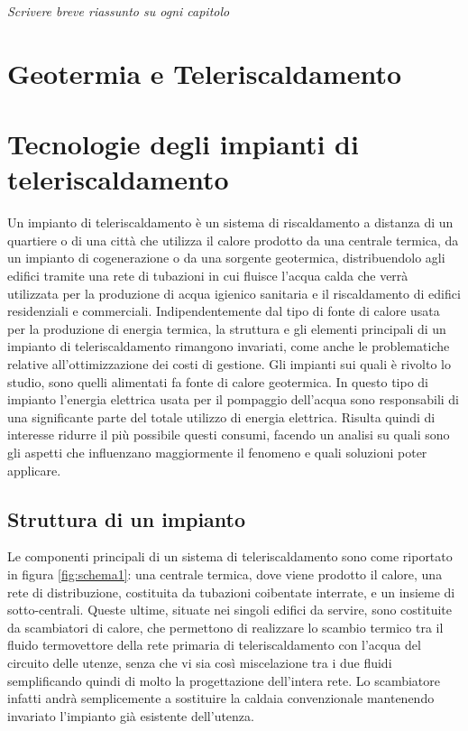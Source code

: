 \documentclass[laurea,oneside,11pt]{USiena_tesiLM}
\begin{document}
\textit{Scrivere breve riassunto su ogni capitolo}

\chapter{Geotermia e Teleriscaldamento}

\chapter{Tecnologie degli impianti di teleriscaldamento}
Un impianto di teleriscaldamento è un  sistema di riscaldamento a distanza di un quartiere o di una città 
che utilizza il calore prodotto da una centrale termica, da un impianto di cogenerazione o da una sorgente geotermica, distribuendolo agli edifici tramite una rete di tubazioni in cui fluisce l'acqua calda che verrà utilizzata per la produzione di acqua igienico sanitaria e il riscaldamento di edifici residenziali e commerciali. Indipendentemente dal tipo di fonte di calore usata per la produzione di energia termica, la struttura e gli elementi principali di un impianto di teleriscaldamento rimangono invariati, come anche le problematiche relative all'ottimizzazione dei costi di gestione. Gli impianti sui quali è rivolto lo studio, sono quelli alimentati fa fonte di calore geotermica. In questo tipo di impianto l'energia elettrica usata per il pompaggio dell'acqua sono responsabili di una significante parte del totale utilizzo di energia elettrica. Risulta quindi di interesse ridurre il più possibile questi consumi, facendo un analisi su quali sono gli aspetti che influenzano maggiormente il fenomeno e quali soluzioni poter applicare. \\

\section{Struttura di un impianto}
Le componenti principali di un sistema di teleriscaldamento sono come riportato in figura \ref{fig:schema1}: una centrale termica, dove viene prodotto il calore, una rete di distribuzione, costituita da tubazioni 
coibentate interrate, e un insieme di sotto-centrali. Queste ultime, situate nei singoli 
edifici da servire, sono costituite da scambiatori di calore, che permettono di realizzare 
lo scambio termico tra il fluido termovettore  della rete primaria di teleriscaldamento con l'acqua del circuito delle utenze, senza che vi sia così miscelazione tra i due fluidi semplificando quindi di molto la progettazione dell'intera rete. Lo scambiatore infatti andrà semplicemente a sostituire la  caldaia convenzionale mantenendo invariato l'impianto già esistente dell'utenza.
\end{document}
